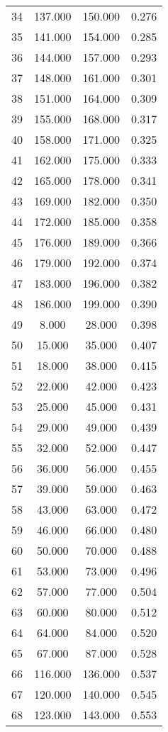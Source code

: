 \begin{tabular}{cccc}
  34 & 137.000 & 150.000 & 0.276 \\ 
  35 & 141.000 & 154.000 & 0.285 \\ 
  36 & 144.000 & 157.000 & 0.293 \\ 
  37 & 148.000 & 161.000 & 0.301 \\ 
  38 & 151.000 & 164.000 & 0.309 \\ 
  39 & 155.000 & 168.000 & 0.317 \\ 
  40 & 158.000 & 171.000 & 0.325 \\ 
  41 & 162.000 & 175.000 & 0.333 \\ 
  42 & 165.000 & 178.000 & 0.341 \\ 
  43 & 169.000 & 182.000 & 0.350 \\ 
  44 & 172.000 & 185.000 & 0.358 \\ 
  45 & 176.000 & 189.000 & 0.366 \\ 
  46 & 179.000 & 192.000 & 0.374 \\ 
  47 & 183.000 & 196.000 & 0.382 \\ 
  48 & 186.000 & 199.000 & 0.390 \\ 
  49 & 8.000 & 28.000 & 0.398 \\ 
  50 & 15.000 & 35.000 & 0.407 \\ 
  51 & 18.000 & 38.000 & 0.415 \\ 
  52 & 22.000 & 42.000 & 0.423 \\ 
  53 & 25.000 & 45.000 & 0.431 \\ 
  54 & 29.000 & 49.000 & 0.439 \\ 
  55 & 32.000 & 52.000 & 0.447 \\ 
  56 & 36.000 & 56.000 & 0.455 \\ 
  57 & 39.000 & 59.000 & 0.463 \\ 
  58 & 43.000 & 63.000 & 0.472 \\ 
  59 & 46.000 & 66.000 & 0.480 \\ 
  60 & 50.000 & 70.000 & 0.488 \\ 
  61 & 53.000 & 73.000 & 0.496 \\ 
  62 & 57.000 & 77.000 & 0.504 \\ 
  63 & 60.000 & 80.000 & 0.512 \\ 
  64 & 64.000 & 84.000 & 0.520 \\ 
  65 & 67.000 & 87.000 & 0.528 \\ 
  66 & 116.000 & 136.000 & 0.537 \\ 
  67 & 120.000 & 140.000 & 0.545 \\ 
  68 & 123.000 & 143.000 & 0.553 \\ 

\end{tabular}
